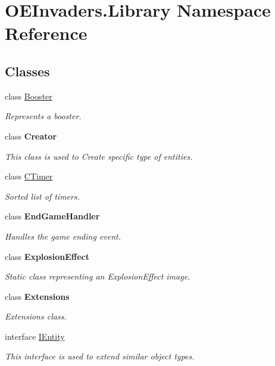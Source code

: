 \hypertarget{namespace_o_e_invaders_1_1_library}{}\section{O\+E\+Invaders.\+Library Namespace Reference}
\label{namespace_o_e_invaders_1_1_library}
\subsection*{Classes}
\begin{DoxyCompactItemize}
\item 
class \mbox{\hyperlink{class_o_e_invaders_1_1_library_1_1_booster}{Booster}}
\begin{DoxyCompactList}\small\item\em Represents a booster. \end{DoxyCompactList}\item 
class {\bfseries Creator}
\begin{DoxyCompactList}\small\item\em This class is used to Create specific type of entities. \end{DoxyCompactList}\item 
class \mbox{\hyperlink{class_o_e_invaders_1_1_library_1_1_c_timer}{C\+Timer}}
\begin{DoxyCompactList}\small\item\em Sorted list of timers. \end{DoxyCompactList}\item 
class {\bfseries End\+Game\+Handler}
\begin{DoxyCompactList}\small\item\em Handles the game ending event. \end{DoxyCompactList}\item 
class {\bfseries Explosion\+Effect}
\begin{DoxyCompactList}\small\item\em Static class representing an Explosion\+Effect image. \end{DoxyCompactList}\item 
class {\bfseries Extensions}
\begin{DoxyCompactList}\small\item\em Extensions class. \end{DoxyCompactList}\item 
interface \mbox{\hyperlink{interface_o_e_invaders_1_1_library_1_1_i_entity}{I\+Entity}}
\begin{DoxyCompactList}\small\item\em This interface is used to extend similar object types. \end{DoxyCompactList}\item 

\end{DoxyCompactItemize}
